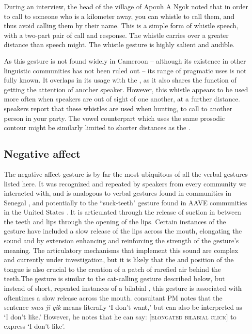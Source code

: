 \documentclass[output=paper,newtxmath,modfonts,nonflat,hidelinks]{langsci/langscibook}
\begin{document}
During an interview, the head of the village of Apouh A Ngok noted that in order to call to someone who is a kilometer away, you can whistle to call them, and thus avoid calling them by their name. This is a simple form of whistle speech, with a two-part pair of call and response. The whistle carries over a greater distance than speech might. The whistle gesture is highly salient and audible. 

As this gesture is not found widely in Cameroon -- although its existence in other linguistic communities has not been ruled out -- its range of pragmatic uses is not fully known. It overlaps in its usage with the , as it also shares the function of getting the attention of another speaker.  However, this whistle appears to be used more often when speakers are out of sight of one another, at a further distance.  speakers report that these whistles are used when hunting, to call to another person in your party. The vowel counterpart which uses the same prosodic contour might be similarly limited to shorter distances as the . 

\subsection{Negative affect}\label{subsec:pillion:NegativeAffect}
The negative affect gesture is by far the most ubiquitous of all the verbal gestures listed here. It was recognized and repeated by speakers from every community we interacted with, and is analogous to verbal gestures found in  communities in Senegal \citep{grenobleetal2015}, and potentially to the ``suck-teeth" gesture found in AAVE communities in the United States \citep{rickfordrickford1976}. It is articulated through the release of suction in between the teeth and lips through the opening of the lips. Certain instances of the gesture have included a slow release of the lips across the mouth, elongating the sound and by extension enhancing and reinforcing the strength of the gesture's meaning. The articulatory mechanisms that implement this sound are complex and currently under investigation, but it is likely that the  and position of the tongue is also crucial to the creation of a patch of rarefied air behind the teeth.The gesture is similar to the cat-calling gesture described below, but instead of short, repeated instances of a bilabial , this gesture is associated with oftentimes a slow release across the mouth. %
 consultant PM notes that the sentence \textit{maa ji gik} means literally `I don't want,' but can also be interpreted as `I don't like.' However, he notes that he can say: [\textsc {elongated bilabial click}] to express `I don't like'. %
\end{document}

